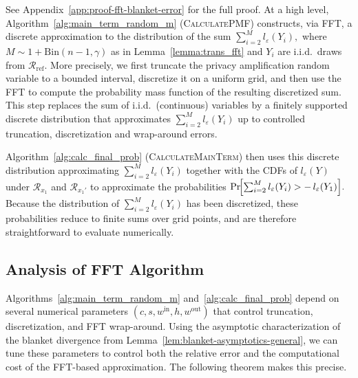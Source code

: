 \documentclass{article}
\theoremstyle{plain}
\theoremstyle{definition}
\begin{document}
See Appendix~\ref{app:proof-fft-blanket-error} for the full proof. At a high level, Algorithm~\ref{alg:main_term_random_m}
(\textsc{CalculatePMF}) constructs, via FFT, a discrete approximation to
the distribution of the sum
$
  \sum_{i=2}^{M} l_\varepsilon(Y_i),
$
where $M\sim 1+\mathrm{Bin}(n-1,\gamma)$ as in
Lemma~\ref{lemma:trans_fft} and $Y_i$ are i.i.d.\ draws from $\mathcal{R}_{\mathrm{ref}}$.
More precisely, we first truncate the privacy amplification random
variable to a bounded interval, discretize it on a uniform grid, and
then use the FFT to compute the probability mass function of the
resulting discretized sum. This step replaces the sum of
i.i.d.\ (continuous) variables by a finitely supported discrete
distribution that approximates
$\sum_{i=2}^{M} l_\varepsilon(Y_i)$ up to controlled
truncation, discretization and wrap-around errors.

Algorithm~\ref{alg:calc_final_prob}
(\textsc{CalculateMainTerm}) then uses this discrete distribution approximating $\sum_{i=2}^{M} l_\varepsilon(Y_i)$ together with the CDFs of $l_\varepsilon(Y)$ under
$\mathcal R_{x_1}$ and $\mathcal R_{x_1'}$ to approximate the
probabilities
$
  \Pr\!\Bigl[\sum_{i=2}^{M} l_\varepsilon(Y_i) > -\,l_\varepsilon(Y_1)\Bigr].
$ 
Because the distribution of $\sum_{i=2}^{M} l_\varepsilon(Y_i)$ has been
discretized, these probabilities reduce to finite sums over grid points,
and are therefore straightforward to evaluate numerically.




\subsection{Analysis of FFT Algorithm}
\label{sec:analysis_fft_algorithm}

Algorithms~\ref{alg:main_term_random_m} and~\ref{alg:calc_final_prob} depend
on several numerical parameters
$(c,s,w^{\mathrm{in}},h,w^{\mathrm{out}})$ that control truncation,
discretization, and FFT wrap-around.
Using the asymptotic characterization of the blanket divergence from
Lemma~\ref{lem:blanket-asymptotics-general}, we can tune these parameters to control both the relative error and the
computational cost of the FFT-based approximation.
The following theorem makes this precise.
\end{document}
